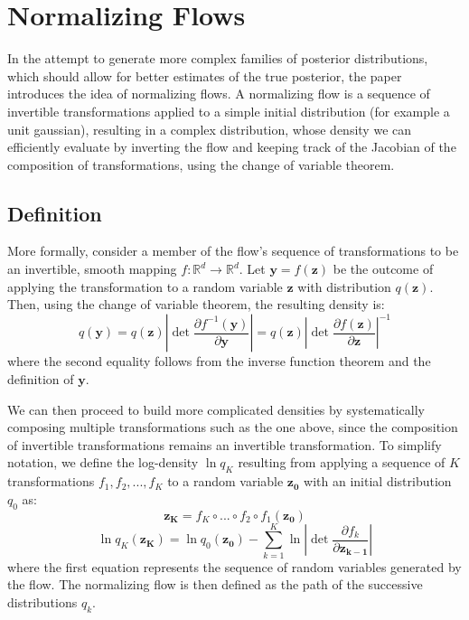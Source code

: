 \chapter{Normalizing Flows}
In the attempt to generate more complex families of posterior distributions, which should allow for better estimates of the true posterior, the paper introduces the idea of normalizing flows. A normalizing flow is a sequence of invertible transformations applied to a simple initial distribution (for example a unit gaussian), resulting in a complex distribution, whose density we can efficiently evaluate by inverting the flow and keeping track of the Jacobian of the composition of transformations, using the change of variable theorem.

\section{Definition}

More formally, consider a member of the flow's sequence of transformations to be an invertible, smooth mapping $f:\mathbb{R}^d \rightarrow \mathbb{R}^d$. Let $\mathbf{y}=f(\mathbf{z})$ be the outcome of applying the transformation to a random variable $\mathbf{z}$ with distribution $q(\mathbf{z})$. Then, using the change of variable theorem, the resulting density is:
\begin{equation}
q(\mathbf{y}) = q(\mathbf{z}) \left| \det \frac{\partial f^{-1}(\mathbf{y})}{\partial \mathbf{y}}  \right| = q(\mathbf{z}) \left| \det \frac{\partial f(\mathbf{z})}{\partial \mathbf{z}} \right| ^ {-1}
\end{equation}
where the second equality follows from the inverse function theorem and the definition of $\mathbf{y}$.

We can then proceed to build more complicated densities by systematically composing multiple transformations such as the one above, since the composition of invertible transformations remains an invertible transformation. To simplify notation, we define the log-density $\ln q_K$ resulting from applying a sequence of $K$ transformations $f_1,f_2,...,f_K$ to a random variable $\mathbf{z_0}$ with an initial distribution $q_0$ as:
\begin{equation}
\mathbf{z_K} = f_K \circ ... \circ f_2 \circ f_1(\mathbf{z_0})
\end{equation}
\begin{equation}
\ln q_K(\mathbf{z_K}) = \ln q_0(\mathbf{z_0}) - \sum_{k=1}^{K} \ln \left| \det \frac{\partial f_k}{\partial \mathbf{z_{k-1}}} \right|
\end{equation}
where the first equation represents the sequence of random variables generated by the flow.  The normalizing flow is then defined as the path of the successive distributions $q_k$. 

